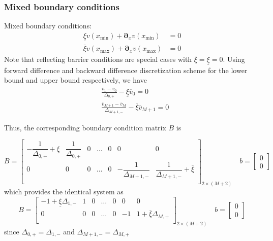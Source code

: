 \documentclass[11pt]{article}
\newcommand{\D}[1][]{\ensuremath{\boldsymbol{\partial}_{#1}}}
\theoremstyle{definition}
\begin{document}
\subsubsection{Mixed boundary conditions}
Mixed boundary conditions:
\begin{align}
\underline{\xi} v({x_{\min}}) + \D[x]v({x_{\min}} ) &= 0\label{eq:new-BC1}\\
\overline{\xi} v({x_{\max}}) + \D[x]v({x_{\max}}) &= 0\label{eq:new-BC2}
\end{align}
Note that reflecting barrier conditions are special cases with $\overline{\xi} = \underline{\xi} = 0$. Using forward difference and backward difference discretization scheme for the lower bound and upper bound respectively, we have
\begin{align}
&\frac{\overline{v}_1 - \overline{v}_0}{\Delta_{0,+}} - \underline{\xi} \overline{v}_0 = 0 \\
&\frac{\overline{v}_{M+1} - \overline{v}_M}{\Delta_{M+1,-}} - \overline{\xi} \overline{v}_{M+1} = 0
\end{align}

Thus, the corresponding boundary condition matrix $B$ is

\begin{equation}\label{eq:mixed-barrier-matrix-original}
B = \begin{bmatrix}
-\dfrac{1}{\Delta_{0,+}} + \underline{\xi} & \dfrac{1}{\Delta_{0,+}} & 0 & \dots & 0 & 0 & 0 \\
0 & 0 & 0 & \dots & 0 & -\dfrac{1}{\Delta_{M+1,-}} & \dfrac{1}{\Delta_{M+1,-}} + \overline{\xi}\\
\end{bmatrix}_{2 \times (M+2)} \quad
b = \begin{bmatrix}
0 \\
0
\end{bmatrix}
\end{equation}
which provides the identical system as
\begin{equation}\label{eq:mixed-barrier-matrix}
B = \begin{bmatrix}
-1 +  \underline{\xi} \Delta_{1,-} & 1 & 0 & \dots & 0 & 0 & 0 \\
0 & 0 & 0 & \dots & 0 & -1 & 1 + \overline{\xi} \Delta_{M,+}\\
\end{bmatrix}_{2 \times (M+2)} \quad
b = \begin{bmatrix}
0 \\
0
\end{bmatrix}
\end{equation}
since $\Delta_{0,+} = \Delta_{1,-}$ and $\Delta_{M+1,-} = \Delta_{M,+}$
\end{document}
